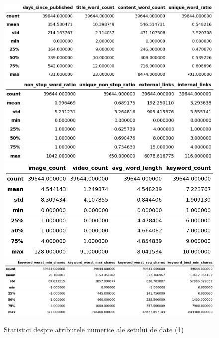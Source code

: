 \documentclass{article}
\begin{document}
\begin{figure}[htb]
    \centering
    \includegraphics[scale=0.4]{news_popularity/analysis/numeric/table1.png}
    \includegraphics[scale=0.4]{news_popularity/analysis/numeric/table2.png}
    \includegraphics[scale=0.4]{news_popularity/analysis/numeric/table3.png}
    \includegraphics[scale=0.4]{news_popularity/analysis/numeric/table4.png}
    \caption{Statistici despre atributele numerice ale setului de date (1)}
    \label{fig:news:num_attr}
\end{figure}
\end{document}
